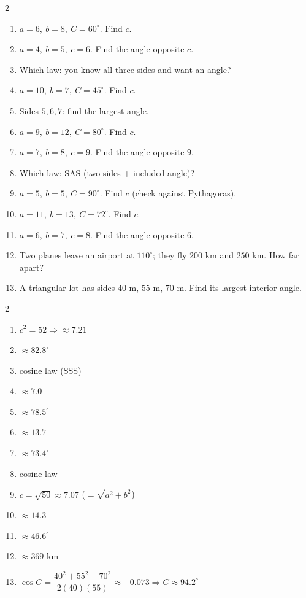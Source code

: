 \documentclass[11pt]{article}
\begin{document}
\begin{recapbox}
\begin{multicols}{2}
\small
\begin{enumerate}[leftmargin=*,itemsep=3pt]
  \item $a=6,\ b=8,\ C=60^\circ$. Find $c$.
  \item $a=4,\ b=5,\ c=6$. Find the angle opposite $c$.
  \item Which law: you know all three sides and want an angle?
  \item $a=10,\ b=7,\ C=45^\circ$. Find $c$.
  \item Sides $5,6,7$: find the largest angle.
  \item $a=9,\ b=12,\ C=80^\circ$. Find $c$.
  \item $a=7,\ b=8,\ c=9$. Find the angle opposite $9$.
  \item Which law: SAS (two sides + included angle)?
  \item $a=5,\ b=5,\ C=90^\circ$. Find $c$ (check against Pythagoras).
  \item $a=11,\ b=13,\ C=72^\circ$. Find $c$.
  \item $a=6,\ b=7,\ c=8$. Find the angle opposite $6$.
  \item Two planes leave an airport at $110^\circ$; they fly $200$ km and $250$ km. How far apart?
  \item A triangular lot has sides $40$ m, $55$ m, $70$ m. Find its largest interior angle.
\end{enumerate}
\end{multicols}
\end{recapbox}

\begin{keybox}
\begin{multicols}{2}
\small
\begin{enumerate}[leftmargin=*,itemsep=3pt]
  \item $c^2=52\Rightarrow\approx7.21$
  \item $\approx82.8^\circ$
  \item cosine law (SSS)
  \item $\approx7.0$
  \item $\approx78.5^\circ$
  \item $\approx13.7$
  \item $\approx73.4^\circ$
  \item cosine law
  \item $c=\sqrt{50}\approx7.07$ ($=\sqrt{a^2+b^2}$)
  \item $\approx14.3$
  \item $\approx46.6^\circ$
  \item $\approx369$ km
  \item $\cos C=\dfrac{40^2+55^2-70^2}{2(40)(55)}\approx-0.073\Rightarrow C\approx94.2^\circ$
\end{enumerate}
\end{multicols}
\end{keybox}
\end{document}
